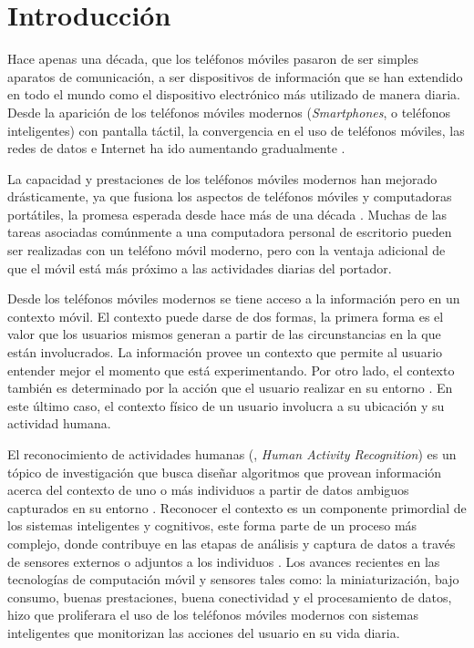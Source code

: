 
\chapter{Introducción}

\label{chap1:introduccion}

Hace apenas una década, que los teléfonos móviles pasaron de ser simples
aparatos de comunicación, a ser dispositivos de información que se
han extendido en todo el mundo como el dispositivo electrónico más
utilizado de manera diaria. Desde la aparición de los teléfonos móviles
modernos (\emph{Smartphones}, o teléfonos inteligentes) con pantalla
táctil, la convergencia en el uso de teléfonos móviles, las redes
de datos e Internet ha ido aumentando gradualmente \cite{Fling2009}.

La capacidad y prestaciones de los teléfonos móviles modernos han
mejorado drásticamente, ya que fusiona los aspectos de teléfonos móviles
y computadoras portátiles, la promesa esperada desde hace más de una
década \cite{Tanenbaum2010}. Muchas de las tareas asociadas comúnmente
a una computadora personal de escritorio pueden ser realizadas con
un teléfono móvil moderno, pero con la ventaja adicional de que el
móvil está más próximo a las actividades diarias del portador.

Desde los teléfonos móviles modernos se tiene acceso a la información
pero en un contexto móvil. El contexto puede darse de dos formas,
la primera forma es el valor que los usuarios mismos generan a partir
de las circunstancias en la que están involucrados. La información
provee un contexto que permite al usuario entender mejor el momento
que está experimentando. Por otro lado, el contexto también es determinado
por la acción que el usuario realizar en su entorno \cite{Fling2009}.
En este último caso, el contexto físico de un usuario involucra a
su ubicación y su actividad humana. 

El reconocimiento de actividades humanas (, \emph{Human
Activity Recognition}) es un tópico de investigación que busca diseñar
algoritmos que provean información acerca del contexto de uno o más
individuos a partir de datos ambiguos capturados en su entorno \cite{Bao2004}.
Reconocer el contexto es un componente primordial de los sistemas
inteligentes y cognitivos, este forma parte de un proceso más complejo,
donde contribuye en las etapas de análisis y captura de datos a través
de sensores externos o adjuntos a los individuos \cite{ReyesOrtiz2015,Chen2012}.
Los avances recientes en las tecnologías de computación móvil y sensores
tales como: la miniaturización, bajo consumo, buenas prestaciones,
buena conectividad y el procesamiento de datos, hizo que proliferara
el uso de los teléfonos móviles modernos con sistemas inteligentes
que monitorizan las acciones del usuario en su vida diaria. 

